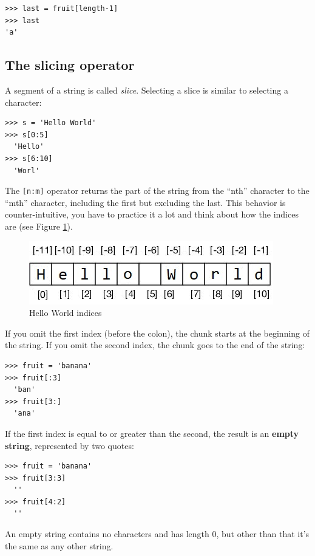 \begin{Verbatim}[frame=single]
>>> last = fruit[length-1]
>>> last
'a'
\end{Verbatim}

\subsection{The slicing operator}

\label{slice}
  
  

A segment of a string is called {\em slice}. Selecting a slice is similar to selecting a character:

\begin{Verbatim}[frame=single]
>>> s = 'Hello World'
>>> s[0:5]
  'Hello'
>>> s[6:10]
  'Worl'
\end{Verbatim}
%
The \texttt{[n:m]} operator returns the part of the string from the ``nth'' character to the ``mth'' character, including the first but excluding the last. This behavior is counter-intuitive, you have to practice it a lot and think about how the indices are (see Figure \ref{fig:string-hola}).

\begin{figure}[h]
\centerline
{\includegraphics[scale=0.8]{images/string-hello.jpg}}
\caption{Hello World indices}
\label{fig:string-hola}
\end{figure}

If you omit the first index (before the colon), the chunk starts at the beginning of the string. If you omit the second index, the chunk goes to the end of the string:

\begin{Verbatim}[frame=single]
>>> fruit = 'banana'
>>> fruit[:3]
  'ban'
>>> fruit[3:]
  'ana'
\end{Verbatim}
%
If the first index is equal to or greater than the second, the result is an \textbf{empty string}, represented by two quotes:

\begin{Verbatim}[frame=single]
>>> fruit = 'banana'
>>> fruit[3:3]
  ''
>>> fruit[4:2]
  ''
\end{Verbatim}
%
An empty string contains no characters and has length 0, but other than that it's the same as any other string.

